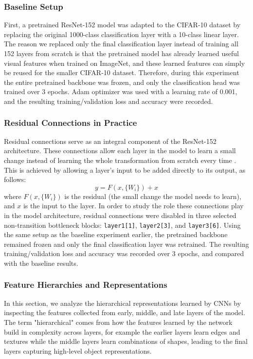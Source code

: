 \documentclass{article}
\begin{document}
\subsubsection{Baseline Setup}
First, a pretrained ResNet-152 model was adapted to the CIFAR-10 dataset by replacing the original 1000-class classification layer with a 10-class linear layer. The reason we replaced only the final classification layer instead of training all 152 layers from scratch is that the pretrained model has already learned useful visual features when trained on ImageNet, and these learned features can simply be reused for the smaller CIFAR-10 dataset. Therefore, during this experiment the entire pretrained backbone was frozen, and only the classification head was trained over 3 epochs. Adam optimizer was used with a learning rate of 0.001, and the resulting training/validation loss and accuracy were recorded.

\subsubsection{Residual Connections in Practice}
Residual connections serve as an integral component of the ResNet-152 architecture.  These connections allow each layer in the model to learn a small change instead of learning the whole transformation from scratch every time \citep{he2016deep}.  This is achieved by allowing a layer's input to be added directly to its output, as follows:
\begin{equation}
    y = F(x, \{W_i\}) + x
    \label{eq:residual}
\end{equation}
where $F(x, \{W_i\})$ is the residual (the small change the model needs to learn), and $x$ is the input to the layer. 
In order to study the role these connections play in the model architecture, residual connections were disabled in three selected non-transition bottleneck blocks:
\texttt{layer1[1]}, \texttt{layer2[3]}, and \texttt{layer3[6]}.
Using the same setup as the baseline experiment earlier, the pretrained backbone remained frozen and only the final classification layer was retrained. The resulting training/validation loss and accuracy was recorded over 3 epochs, and compared with the baseline results.

\subsubsection{Feature Hierarchies and Representations}
In this section, we analyze the hierarchical representations learned by CNNs by inspecting the features collected from early, middle, and late layers of the model. The term "hierarchical" comes from how the features learned by the network build in complexity across layers, for example the earlier layers learn edges and textures while the middle layers learn combinations of shapes, leading to the final layers capturing high-level object representations.
\end{document}
